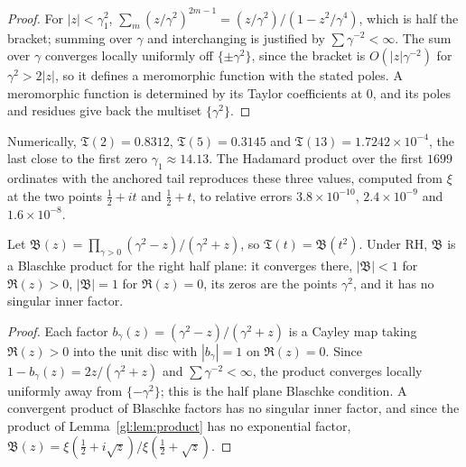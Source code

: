 \begin{proof}
For $|z|<\gamma_1^2$, $\sum_m(z/\gamma^2)^{2m-1}=(z/\gamma^2)/(1-z^2/\gamma^4)$, which is half the bracket; summing over $\gamma$ and interchanging is justified by $\sum\gamma^{-2}<\infty$. The sum over $\gamma$ converges locally uniformly off $\{\pm\gamma^2\}$, since the bracket is $O(|z|\gamma^{-2})$ for $\gamma^2>2|z|$, so it defines a meromorphic function with the stated poles. A meromorphic function is determined by its Taylor coefficients at $0$, and its poles and residues give back the multiset $\{\gamma^2\}$.
\end{proof}

Numerically, $\mathfrak T(2)=0.8312$, $\mathfrak T(5)=0.3145$ and $\mathfrak T(13)=1.7242\times10^{-4}$, the last close to the first zero $\gamma_1\approx14.13$. The Hadamard product over the first $1699$ ordinates with the anchored tail reproduces these three values, computed from $\xi$ at the two points $\tfrac12+it$ and $\tfrac12+t$, to relative errors $3.8\times10^{-10}$, $2.4\times10^{-9}$ and $1.6\times10^{-8}$.

\begin{proposition}\label{gl:prop:inner}
Let $\mathfrak B(z) = \prod_{\gamma>0}(\gamma^2-z)/(\gamma^2+z)$, so $\mathfrak T(t)=\mathfrak B(t^2)$. Under RH, $\mathfrak B$ is a Blaschke product for the right half plane: it converges there, $|\mathfrak B|<1$ for $\Re(z)>0$, $|\mathfrak B|=1$ for $\Re(z)=0$, its zeros are the points $\gamma^2$, and it has no singular inner factor.
\end{proposition}

\begin{proof}
Each factor $b_\gamma(z)=(\gamma^2-z)/(\gamma^2+z)$ is a Cayley map taking $\Re(z)>0$ into the unit disc with $|b_\gamma|=1$ on $\Re(z)=0$. Since $1-b_\gamma(z)=2z/(\gamma^2+z)$ and $\sum\gamma^{-2}<\infty$, the product converges locally uniformly away from $\{-\gamma^2\}$; this is the half plane Blaschke condition. A convergent product of Blaschke factors has no singular inner factor, and since the product of Lemma~\ref{gl:lem:product} has no exponential factor, $\mathfrak B(z) = \xi(\tfrac12+i\sqrt z)/\xi(\tfrac12+\sqrt z)$.
\end{proof}

